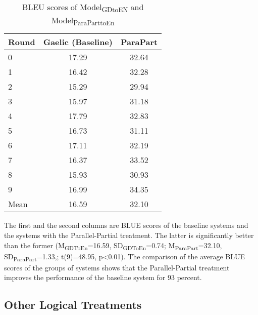 \documentclass[a4paper]{article}
\begin{document}
\begin{table}[ht]
\centering
\begin{tabular}{lcc}
  \hline
Round & Gaelic (Baseline) & ParaPart \\ 
  \hline
0 & 17.29 & 32.64 \\ 
  1 & 16.42 & 32.28 \\ 
  2 & 15.29 & 29.94 \\ 
  3 & 15.97 & 31.18 \\ 
  4 & 17.79 & 32.83 \\ 
  5 & 16.73 & 31.11 \\ 
  6 & 17.11 & 32.19 \\ 
  7 & 16.37 & 33.52 \\ 
  8 & 15.93 & 30.93 \\ 
  9 & 16.99 & 34.35 \\ 
   \hline
Mean & 16.59 & 32.10 \\ 
   \hline
\end{tabular}
\caption{BLEU scores of Model\textsubscript{GDtoEN} and Model\textsubscript{ParaParttoEn}} 
\label{Table:ParaPart}
\end{table}
The first and the second columns are BLUE scores of the baseline systems and the systems with the Parallel-Partial treatment. The latter is significantly better than the former
(M\textsubscript{GDToEn}=16.59, SD\textsubscript{GDToEn}=0.74; M\textsubscript{ParaPart}=32.10, SD\textsubscript{ParaPart}=1.33,; t(9)=48.95, p<0.01).
The comparison of the average BLUE scores of the groups of systems shows that the Parallel-Partial treatment improves the performance of the baseline system for 93 percent.


\subsection{Other Logical Treatments}
\end{document}

